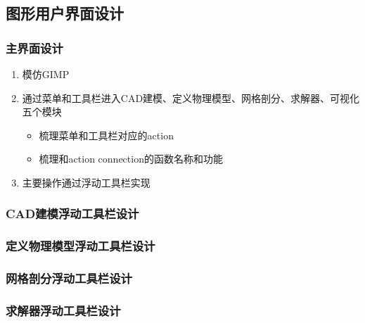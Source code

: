 \documentclass[letterpaper,10pt,english]{sphinxmanual}
\begin{document}
\subsection{图形用户界面设计}
\label{\detokenize{src/airfoil/airfoil_prepost:id2}}

\subsubsection{主界面设计}
\label{\detokenize{src/airfoil/airfoil_prepost:id3}}\begin{enumerate}
%
\item {} 
\sphinxAtStartPar
模仿GIMP

\item {} 
\sphinxAtStartPar
通过菜单和工具栏进入CAD建模、定义物理模型、网格剖分、求解器、可视化五个模块
\begin{itemize}
\item {} 
\sphinxAtStartPar
梳理菜单和工具栏对应的action

\item {} 
\sphinxAtStartPar
梳理和action connection的函数名称和功能

\end{itemize}

\item {} 
\sphinxAtStartPar
主要操作通过浮动工具栏实现

\end{enumerate}


\subsubsection{CAD建模浮动工具栏设计}
\label{\detokenize{src/airfoil/airfoil_prepost:cad}}

\subsubsection{定义物理模型浮动工具栏设计}
\label{\detokenize{src/airfoil/airfoil_prepost:id4}}

\subsubsection{网格剖分浮动工具栏设计}
\label{\detokenize{src/airfoil/airfoil_prepost:id5}}

\subsubsection{求解器浮动工具栏设计}
\label{\detokenize{src/airfoil/airfoil_prepost:id6}}
\end{document}
